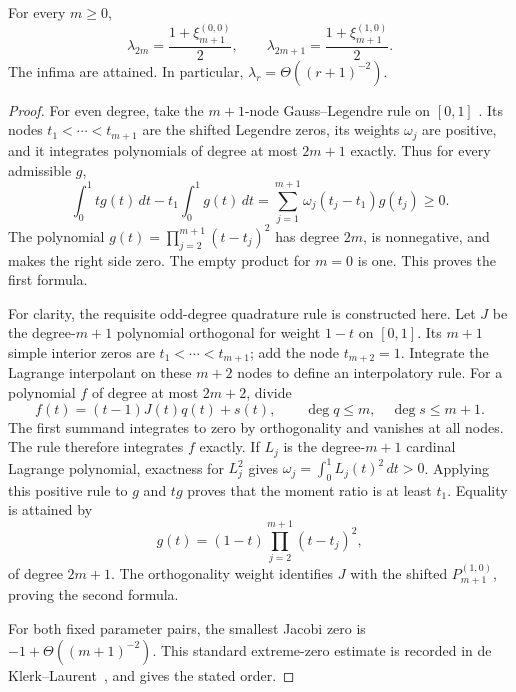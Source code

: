\begin{theorem}
For every $m\ge0$,
\begin{equation}
 \lambda_{2m}=\frac{1+\xi_{m+1}^{(0,0)}}2,
 \qquad
 \lambda_{2m+1}=\frac{1+\xi_{m+1}^{(1,0)}}2.
 \label{eq:p9-exact-lambda}
\end{equation}
The infima are attained. In particular,
$\lambda_r=\Theta((r+1)^{-2})$.
\end{theorem}
\begin{proof}
For even degree, take the $m+1$-node Gauss--Legendre rule on $[0,1]$
\cite[Section~3.5(v)]{dlmf}.
Its nodes $t_1<\cdots<t_{m+1}$ are the shifted Legendre zeros, its
weights $\omega_j$ are positive, and it integrates polynomials of degree
at most $2m+1$ exactly. Thus for every admissible $g$,
\[
 \int_0^1 t g(t)\,dt-t_1\int_0^1g(t)\,dt
  =\sum_{j=1}^{m+1}\omega_j(t_j-t_1)g(t_j)\ge0.
\]
The polynomial $g(t)=\prod_{j=2}^{m+1}(t-t_j)^2$ has degree $2m$,
is nonnegative, and makes the right side zero. The empty product for
$m=0$ is one. This proves the first formula.

For clarity, the requisite odd-degree quadrature rule is constructed here.
Let $J$ be the degree-$m+1$ polynomial orthogonal for weight $1-t$ on
$[0,1]$. Its $m+1$ simple interior zeros are $t_1<\cdots<t_{m+1}$;
add the node $t_{m+2}=1$. Integrate the Lagrange interpolant on these
$m+2$ nodes to define an interpolatory rule. For a polynomial $f$ of
degree at most $2m+2$, divide
\[
 f(t)=(t-1)J(t)q(t)+s(t),\qquad
 \deg q\le m,\quad\deg s\le m+1.
\]
The first summand integrates to zero by orthogonality and vanishes at all
nodes. The rule therefore integrates $f$ exactly. If $L_j$ is the
degree-$m+1$ cardinal Lagrange polynomial, exactness for $L_j^2$ gives
$\omega_j=\int_0^1L_j(t)^2\,dt>0$.
Applying this positive rule to $g$ and $tg$ proves that the moment ratio
is at least $t_1$. Equality is attained by
\[
 g(t)=(1-t)\prod_{j=2}^{m+1}(t-t_j)^2,
\]
of degree $2m+1$. The orthogonality weight identifies $J$ with the
shifted $P_{m+1}^{(1,0)}$, proving the second formula.

For both fixed parameter pairs, the smallest Jacobi zero is
$-1+\Theta((m+1)^{-2})$. This standard extreme-zero estimate is recorded
in de Klerk--Laurent~\cite[Corollary~2.3]{deklerk}, and gives the stated order.
\end{proof}

